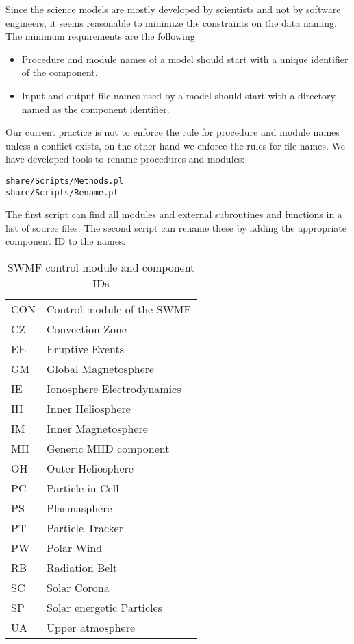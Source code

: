 \documentclass{article}
\begin{document}
Since the science models are mostly developed by scientists and not
by software engineers, it seems reasonable to minimize the constraints
on the data naming. The minimum requirements are the following
\begin{itemize}
\item Procedure and module names of a model should start with a unique 
      identifier of the component.
\item Input and output file names used by a model should start with a directory
      named as the component identifier.
\end{itemize}
Our current practice is not to enforce the rule for procedure and module
names unless a conflict exists, on the other hand we 
enforce the rules for file names. We have developed tools to rename procedures
and modules:
\begin{verbatim}
share/Scripts/Methods.pl
share/Scripts/Rename.pl
\end{verbatim}
The first script can find all modules and external subroutines and functions 
in a list of source files. The second script can rename these by adding
the appropriate component ID to the names.

\begin{table}
\caption{SWMF control module and component IDs}
\begin{center}
\begin{tabular}{ll}
CON & Control module of the SWMF\\
CZ &  Convection Zone \\
EE &  Eruptive Events \\
GM &  Global Magnetosphere \\
IE &  Ionosphere Electrodynamics \\
IH &  Inner Heliosphere \\
IM &  Inner Magnetosphere \\
MH &  Generic MHD component\\
OH &  Outer Heliosphere \\
PC &  Particle-in-Cell \\
PS &  Plasmasphere \\
PT &  Particle Tracker \\
PW &  Polar Wind \\
RB &  Radiation Belt \\
SC &  Solar Corona \\
SP &  Solar energetic Particles \\
UA &  Upper atmosphere
\end{tabular}
\end{center}
\label{tab:components}
\end{table}
\end{document}
